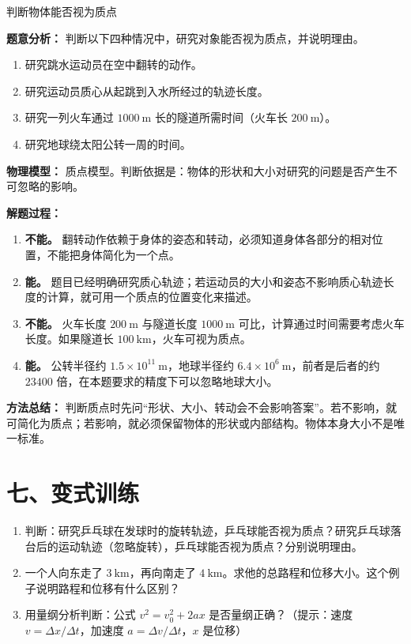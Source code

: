 \begin{examplebox}{判断物体能否视为质点}

\textbf{题意分析：} 判断以下四种情况中，研究对象能否视为质点，并说明理由。

\begin{enumerate}
  \item 研究跳水运动员在空中翻转的动作。
  \item 研究运动员质心从起跳到入水所经过的轨迹长度。
  \item 研究一列火车通过 $1000\ \mathrm{m}$ 长的隧道所需时间（火车长 $200\ \mathrm{m}$）。
  \item 研究地球绕太阳公转一周的时间。
\end{enumerate}

\textbf{物理模型：} 质点模型。判断依据是：物体的形状和大小对研究的问题是否产生不可忽略的影响。

\textbf{解题过程：}
\begin{enumerate}
  \item \textbf{不能。} 翻转动作依赖于身体的姿态和转动，必须知道身体各部分的相对位置，不能把身体简化为一个点。
  \item \textbf{能。} 题目已经明确研究质心轨迹；若运动员的大小和姿态不影响质心轨迹长度的计算，就可用一个质点的位置变化来描述。
  \item \textbf{不能。} 火车长度 $200\ \mathrm{m}$ 与隧道长度 $1000\ \mathrm{m}$ 可比，计算通过时间需要考虑火车长度。如果隧道长 $100\ \mathrm{km}$，火车可视为质点。
  \item \textbf{能。} 公转半径约 $1.5\times 10^{11}\ \mathrm{m}$，地球半径约 $6.4\times 10^{6}\ \mathrm{m}$，前者是后者的约 $23400$ 倍，在本题要求的精度下可以忽略地球大小。
\end{enumerate}

\textbf{方法总结：} 判断质点时先问“形状、大小、转动会不会影响答案”。若不影响，就可简化为质点；若影响，就必须保留物体的形状或内部结构。物体本身大小不是唯一标准。

\end{examplebox}

\section*{七、变式训练}

\begin{enumerate}
  \item 判断：研究乒乓球在发球时的旋转轨迹，乒乓球能否视为质点？研究乒乓球落台后的运动轨迹（忽略旋转），乒乓球能否视为质点？分别说明理由。
  \item 一个人向东走了 $3\ \mathrm{km}$，再向南走了 $4\ \mathrm{km}$。求他的总路程和位移大小。这个例子说明路程和位移有什么区别？
  \begin{center}
  
  \end{center}
  \item 用量纲分析判断：公式 $v^2 = v_0^2 + 2ax$ 是否量纲正确？（提示：速度 $v=\Delta x/\Delta t$，加速度 $a=\Delta v/\Delta t$，$x$ 是位移）
\end{enumerate}

